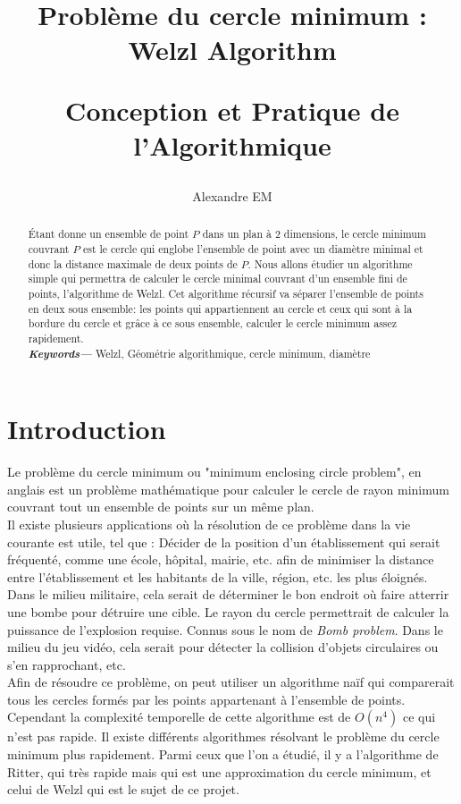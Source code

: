 \documentclass[12pt, a4paper, titlepage]{article}
\title{
    \textbf{Problème du cercle minimum : Welzl Algorithm}\\
    \begin{large} 
    Conception et Pratique de l'Algorithmique
    \end{large}
    }
\author{Alexandre EM}
\providecommand{\keywords}[1]
{
  \small	
  \textbf{\textit{Keywords---}} #1
}
\begin{document}
\maketitle

\begin{abstract}
    Étant donne un ensemble de point $P$ dans un plan à 2 dimensions, le cercle minimum couvrant $P$ est le cercle qui englobe l'ensemble de point avec un diamètre minimal et donc la distance maximale de deux points de $P$. Nous allons étudier un algorithme simple qui permettra de calculer le cercle minimal couvrant d'un ensemble fini de points, l'algorithme de Welzl. Cet algorithme récursif va séparer l'ensemble de points en deux sous ensemble: les points qui appartiennent au cercle et ceux qui sont à la bordure du cercle et grâce à ce sous ensemble, calculer le cercle minimum assez rapidement.\\
    
\keywords{Welzl, Géométrie algorithmique, cercle minimum, diamètre}
\end{abstract}
\tableofcontents
\newpage
\section{Introduction}
    Le problème du cercle minimum ou "minimum enclosing circle problem", en anglais est un problème mathématique pour calculer le cercle de rayon minimum couvrant tout un ensemble de points sur un même plan.\\
    Il existe plusieurs applications où la résolution de ce problème dans la vie courante est utile, tel que : Décider de la position d'un établissement qui serait fréquenté, comme une école, hôpital, mairie, etc. afin de minimiser la distance entre l'établissement et les habitants de la ville, région, etc. les plus éloignés. Dans le milieu militaire, cela serait de déterminer le bon endroit où faire atterrir une bombe pour détruire une cible. Le rayon du cercle permettrait de calculer la puissance de l'explosion requise. Connus sous le nom de \textit{Bomb problem}. Dans le milieu du jeu vidéo, cela serait pour détecter la collision d'objets circulaires ou s'en rapprochant, etc.\\
    
    Afin de résoudre ce problème, on peut utiliser un algorithme naïf qui comparerait tous les cercles formés par les points appartenant à l'ensemble de points. Cependant la complexité temporelle de cette algorithme est de $O(n^{4})$ ce qui n'est pas rapide. Il existe différents algorithmes résolvant le problème du cercle minimum plus rapidement. Parmi ceux que l'on a étudié, il y a l'algorithme de Ritter, qui très rapide mais qui est une approximation du cercle minimum, et celui de Welzl qui est le sujet de ce projet.
\end{document}
